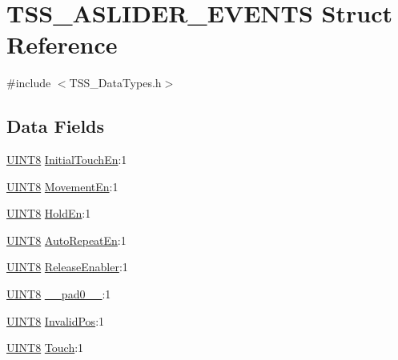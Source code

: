 \hypertarget{struct_t_s_s___a_s_l_i_d_e_r___e_v_e_n_t_s}{}\section{T\+S\+S\+\_\+\+A\+S\+L\+I\+D\+E\+R\+\_\+\+E\+V\+E\+N\+TS Struct Reference}
\label{struct_t_s_s___a_s_l_i_d_e_r___e_v_e_n_t_s}


{\ttfamily \#include $<$T\+S\+S\+\_\+\+Data\+Types.\+h$>$}

\subsection*{Data Fields}
\begin{DoxyCompactItemize}
\item 
\hyperlink{_t_s_s___data_types_8h_ab27e9918b538ce9d8ca692479b375b6a}{U\+I\+N\+T8} \hyperlink{struct_t_s_s___a_s_l_i_d_e_r___e_v_e_n_t_s_af1478c480c5f9ff2589d8e687ad1ade4}{Initial\+Touch\+En}\+:1
\item 
\hyperlink{_t_s_s___data_types_8h_ab27e9918b538ce9d8ca692479b375b6a}{U\+I\+N\+T8} \hyperlink{struct_t_s_s___a_s_l_i_d_e_r___e_v_e_n_t_s_a7011ab8c0efec25677b2287c886370d0}{Movement\+En}\+:1
\item 
\hyperlink{_t_s_s___data_types_8h_ab27e9918b538ce9d8ca692479b375b6a}{U\+I\+N\+T8} \hyperlink{struct_t_s_s___a_s_l_i_d_e_r___e_v_e_n_t_s_a3cd1f8b7d5809d5a12f9a7d5b3b780e7}{Hold\+En}\+:1
\item 
\hyperlink{_t_s_s___data_types_8h_ab27e9918b538ce9d8ca692479b375b6a}{U\+I\+N\+T8} \hyperlink{struct_t_s_s___a_s_l_i_d_e_r___e_v_e_n_t_s_a714a49a3965b0bb1a5187fb6079f51e3}{Auto\+Repeat\+En}\+:1
\item 
\hyperlink{_t_s_s___data_types_8h_ab27e9918b538ce9d8ca692479b375b6a}{U\+I\+N\+T8} \hyperlink{struct_t_s_s___a_s_l_i_d_e_r___e_v_e_n_t_s_a7f5f3751fee0f5a199948ffb87697255}{Release\+Enabler}\+:1
\item 
\hyperlink{_t_s_s___data_types_8h_ab27e9918b538ce9d8ca692479b375b6a}{U\+I\+N\+T8} \hyperlink{struct_t_s_s___a_s_l_i_d_e_r___e_v_e_n_t_s_a2ee36fe5d196fb00b71d0929ff19fe04}{\+\_\+\+\_\+pad0\+\_\+\+\_\+}\+:1
\item 
\hyperlink{_t_s_s___data_types_8h_ab27e9918b538ce9d8ca692479b375b6a}{U\+I\+N\+T8} \hyperlink{struct_t_s_s___a_s_l_i_d_e_r___e_v_e_n_t_s_aec6b9236894a06231c35520f44102548}{Invalid\+Pos}\+:1
\item 
\hyperlink{_t_s_s___data_types_8h_ab27e9918b538ce9d8ca692479b375b6a}{U\+I\+N\+T8} \hyperlink{struct_t_s_s___a_s_l_i_d_e_r___e_v_e_n_t_s_af14847cac91c6738b89713699d9b9c75}{Touch}\+:1
\end{DoxyCompactItemize}



